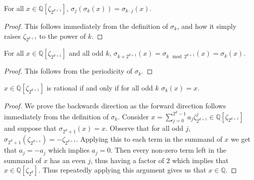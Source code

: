 \documentclass[12pt]{dalthesis}
\begin{document}
\begin{proposition}
For all $x \in \mathbb{Q}[\zeta_{2^{d+1}}]$, $\sigma_j(\sigma_k (x)) = \sigma_{k\cdot j}(x)$.
\end{proposition}
\begin{proof}
This follows immediately from the definition of $\sigma_k$, and how it simply raises $\zeta_{2^{d+1}}$ to the power of $k$.
\end{proof}

\begin{proposition}
\label{sigmaperiod}
For all $x \in \mathbb{Q}[\zeta_{2^{d+1}}]$ and all odd $k$, $\sigma_{k+2^{d+1}}(x) = \sigma_{k \mod 2^{d+1}}(x) = \sigma_k (x)$.
\end{proposition}
\begin{proof}
This follows from the periodicity of $\sigma_k$.
\end{proof}

\begin{proposition}
\label{sigmaration}
$x \in \mathbb{Q}[\zeta_{2^{d+1}}]$ is rational if and only if for all odd $k$ $\sigma_k(x) = x$.
\end{proposition}
\begin{proof}
We prove the backwards direction as the forward direction follows immediately from the definition of $\sigma_k$. Consider $x = \sum\limits_{j=0}^{2^d-1} a_j \zeta_{2^{d+1}}^j \in \mathbb{Q}[\zeta_{2^{d+1}}]$ and suppose that $\sigma_{2^d+1} (x) = x$. Observe that for all odd $j$, $\sigma_{2^d+1} (\zeta_{2^{d+1}}) = -\zeta_{2^{d+1}}$. Applying this to each term in the summand of $x$ we get that $a_j = - a_j$ which implies $a_j = 0$. Then every non-zero term left in the summand of $x$ has an even $j$, thus having a factor of $2$ which implies that $x \in \mathbb{Q}[\zeta_{2^{d}}]$. Thus repeatedly applying this argument gives us that $x \in \mathbb{Q}$.
\end{proof}
\end{document}
